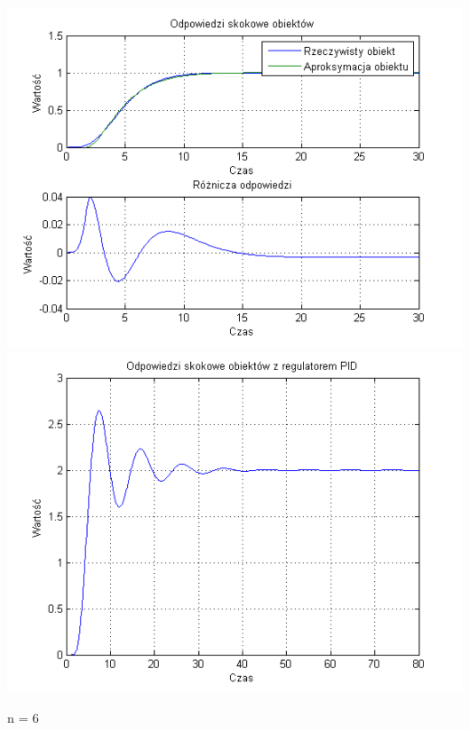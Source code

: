 \documentclass[10pt,a4paper]{article}
\begin{document}
\begin{center}
\includegraphics[scale=1]{images/dwa/skrypt_109.png}\\
\includegraphics[scale=1]{images/dwa/skrypt_110.png}\\
\end{center}
\newpage
n = 6
\end{document}
